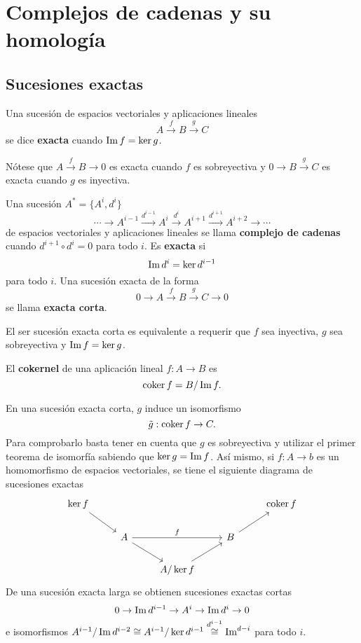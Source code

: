 \documentclass[CV.tex]{subfiles}
\begin{document}

\chapter{Complejos de cadenas y su homología}
\section{Sucesiones exactas}
\begin{defi}
Una sucesión de espacios vectoriales y aplicaciones lineales 
\[
A\overset{f}{\to}B\overset{g}{\to}C
\]
se dice \textbf{exacta} cuando $\operatorname{Im}{f}=\ker{g}$.
\end{defi}

Nótese que $A\overset{f}{\to}B\to 0$ es exacta cuando $f$ es sobreyectiva y $0\to B\overset{g}{\to}C$ es exacta cuando $g$ es inyectiva.

\begin{defi}
Una sucesión $A^*=\{A^i, d^i\}$
\[
\cdots\to A^{i-1}\overset{d^{i-1}}{\to}A^i\overset{d^i}{\to}A^{i+1}\overset{d^{i+1}}{\to}A^{i+2}\to\cdots
\]
de espacios vectoriales y aplicaciones lineales se llama \textbf{complejo de cadenas} cuando $d^{i+1}\circ d^i=0$ para todo $i$. Es \textbf{exacta} si
\[
\operatorname{Im}{d^i}=\ker{d^{i-1}}
\]
para todo $i$. Una sucesión exacta de la forma
\[
0\to A\overset{f}{\to}B\overset{g}{\to}C\to 0
\]
se llama \textbf{exacta corta}.
\end{defi}

El ser sucesión exacta corta es equivalente a requerir que $f$ sea inyectiva, $g$ sea sobreyectiva y $\operatorname{Im}{f}=\ker{g}$.

\begin{defi}
El \textbf{cokernel} de una aplicación lineal $f:A\to B$ es
\[
\operatorname{coker}{f}=B/\operatorname{Im}{f}.
\]
\end{defi}


En una sucesión exacta corta, $g$ induce un isomorfismo
\[
\tilde{g}:\operatorname{coker}{f}\to C.
\]
Para comprobarlo basta tener en cuenta que $g$ es sobreyectiva y utilizar el primer teorema de isomorfía sabiendo que $\ker{g}=\operatorname{Im}{f}$. Así mismo, si $f:A\to b$ es un homomorfismo de espacios vectoriales, se tiene el siguiente diagrama de sucesiones exactas
\[
\begin{tikzcd}
\ker{f}\arrow[dr] & &  & & \coker{f}\\
& A\arrow[rr,"f"]\arrow[dr] & & B\arrow[ur] & \\
& & A/\ker{f}\arrow[ur] & &
\end{tikzcd}
\]
De una sucesión exacta larga se obtienen sucesiones exactas cortas
\[
0\to \operatorname{Im}{d^{i-1}}\to  A^i\to \operatorname{Im}{d^i}\to 0
\]
e isomorfismos $A^{i-1}/\operatorname{Im}{d^{i-2}}\cong A^{i-1}/\ker{d^{i-1}}\overset{d^{i-1}}{\cong}\operatorname{Im}^{d-i}$ para todo $i$. 
\end{document}
